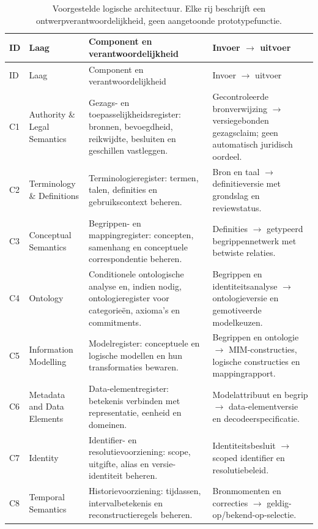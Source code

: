 \begingroup\small
\begin{longtable}{@{}P{.075\linewidth}P{.24\linewidth}P{.34\linewidth}P{.25\linewidth}@{}}
\caption{Voorgestelde logische architectuur. Elke rij beschrijft een ontwerpverantwoordelijkheid, geen aangetoonde prototypefunctie.}\label{tab:layers}\\
\toprule ID & Laag & Component en verantwoordelijkheid & Invoer $\rightarrow$ uitvoer \\ \midrule\endfirsthead
\toprule ID & Laag & Component en verantwoordelijkheid & Invoer $\rightarrow$ uitvoer \\ \midrule\endhead
C1 & Authority \& Legal Semantics & Gezags- en toepasselijkheidsregister: bronnen, bevoegdheid, reikwijdte, besluiten en geschillen vastleggen. & Gecontroleerde bronverwijzing $\rightarrow$ versiegebonden gezagsclaim; geen automatisch juridisch oordeel. \\
C2 & Terminology \& Definitions & Terminologieregister: termen, talen, definities en gebruikscontext beheren. & Bron en taal $\rightarrow$ definitieversie met grondslag en reviewstatus. \\
C3 & Conceptual Semantics & Begrippen- en mappingregister: concepten, samenhang en conceptuele correspondentie beheren. & Definities $\rightarrow$ getypeerd begrippennetwerk met betwiste relaties. \\
C4 & Ontology & Conditionele ontologische analyse en, indien nodig, ontologieregister voor categorieën, axioma’s en commitments. & Begrippen en identiteitsanalyse $\rightarrow$ ontologieversie en gemotiveerde modelkeuzen. \\
C5 & Information Modelling & Modelregister: conceptuele en logische modellen en hun transformaties bewaren. & Begrippen en ontologie $\rightarrow$ MIM-constructies, logische constructies en mappingrapport. \\
C6 & Metadata and Data Elements & Data-elementregister: betekenis verbinden met representatie, eenheid en domeinen. & Modelattribuut en begrip $\rightarrow$ data-elementversie en decodeerspecificatie. \\
C7 & Identity & Identifier- en resolutievoorziening: scope, uitgifte, alias en versie-identiteit beheren. & Identiteitsbesluit $\rightarrow$ scoped identifier en resolutiebeleid. \\
C8 & Temporal Semantics & Historievoorziening: tijdassen, intervalbetekenis en reconstructieregels beheren. & Bronmomenten en correcties $\rightarrow$ geldig-op/bekend-op-selectie. \\

\end{longtable}
